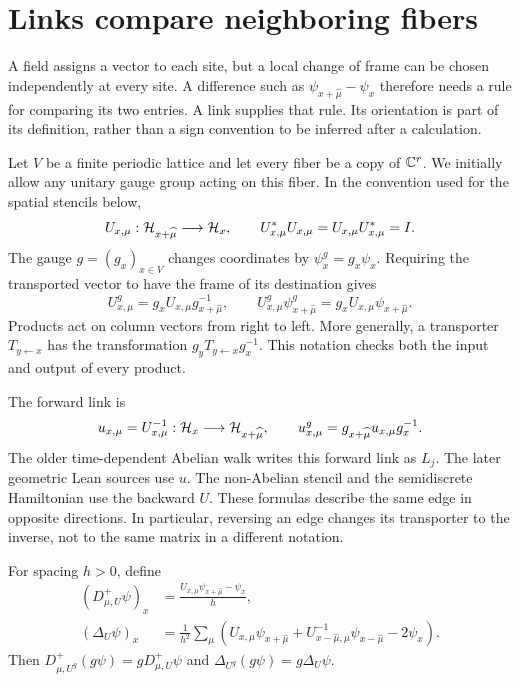 \section{Links compare neighboring fibers}\label{g:links}

A field assigns a vector to each site, but a local change of frame can be chosen independently at every site. A difference such as $\psi_{x+\widehat\mu}-\psi_x$ therefore needs a rule for comparing its two entries. A link supplies that rule. Its orientation is part of its definition, rather than a sign convention to be inferred after a calculation.

Let $V$ be a finite periodic lattice and let every fiber be a copy of $\mathbb C^r$. We initially allow any unitary gauge group acting on this fiber. In the convention used for the spatial stencils below,
\begin{equation}\label{g:backward-link}
 U_{x,\mu}:\mathcal H_{x+\widehat\mu}\longrightarrow\mathcal H_x,
 \qquad U_{x,\mu}^*U_{x,\mu}=U_{x,\mu}U_{x,\mu}^*=I.
\end{equation}
The gauge $g=(g_x)_{x\in V}$ changes coordinates by $\psi_x^g=g_x\psi_x$. Requiring the transported vector to have the frame of its destination gives
\begin{equation}\label{g:link-transform}
 U_{x,\mu}^g=g_xU_{x,\mu}g_{x+\widehat\mu}^{-1},
 \qquad U_{x,\mu}^g\psi_{x+\widehat\mu}^g
 =g_xU_{x,\mu}\psi_{x+\widehat\mu}.
\end{equation}
Products act on column vectors from right to left. More generally, a transporter $T_{y\leftarrow x}$ has the transformation $g_yT_{y\leftarrow x}g_x^{-1}$. This notation checks both the input and output of every product.

The forward link is
\begin{equation}\label{g:forward-link}
 u_{x,\mu}=U_{x,\mu}^{-1}:\mathcal H_x\longrightarrow\mathcal H_{x+\widehat\mu},
 \qquad u_{x,\mu}^g=g_{x+\widehat\mu}u_{x,\mu}g_x^{-1}.
\end{equation}
The older time-dependent Abelian walk writes this forward link as $L_j$. The later geometric Lean sources use $u$. The non-Abelian stencil and the semidiscrete Hamiltonian use the backward $U$. These formulas describe the same edge in opposite directions. In particular, reversing an edge changes its transporter to the inverse, not to the same matrix in a different notation.

\begin{proposition}\label{g:stencil-covariance}
For spacing $h>0$, define
\begin{align}
 (D^+_{\mu,U}\psi)_x
 &=\frac{U_{x,\mu}\psi_{x+\widehat\mu}-\psi_x}{h},\label{g:forward-difference}\\
 (\Delta_U\psi)_x
 &=\frac1{h^2}\sum_\mu\left(
 U_{x,\mu}\psi_{x+\widehat\mu}
 +U_{x-\widehat\mu,\mu}^{-1}\psi_{x-\widehat\mu}-2\psi_x\right).
 \label{g:laplacian}
\end{align}
Then $D^+_{\mu,U^g}(g\psi)=gD^+_{\mu,U}\psi$ and
$\Delta_{U^g}(g\psi)=g\Delta_U\psi$.
\end{proposition}

